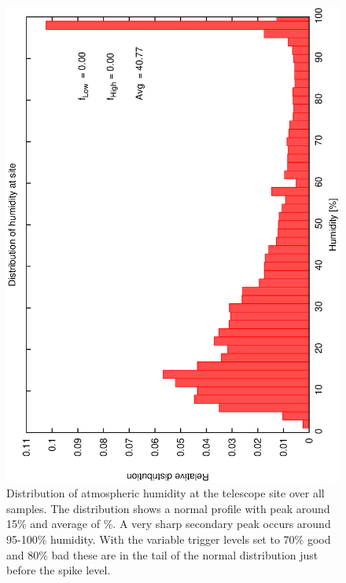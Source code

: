 \documentclass[12pt,a4paper]{article}
\begin{document}
\begin{figure}[htbp]
  \begin{center}
    \includegraphics[scale=0.4, angle=-90]{figures/ecs/hum.dat.eps}
  \end{center}
  \caption[Relative distribution of humidity at telescope site.]
{Distribution of atmospheric humidity at the telescope site over all samples. The distribution shows a normal profile with peak around 15\% and average of \%. A very sharp secondary peak occurs around 95-100\% humidity. With the variable trigger levels set to 70\% good and 80\% bad these are in the tail of the normal distribution just before the spike level.}
  \label{fig:met_humidity_dist}
\end{figure}
\end{document}

